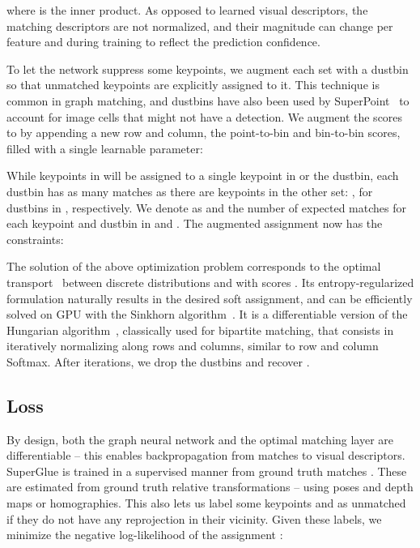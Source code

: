 \documentclass[10pt,twocolumn,letterpaper]{article}
\newcommand{\PAR}[1]{\vskip4pt \noindent{\bf #1~}}
\renewcommand{\*}[1]{\mathbf{#1}}
\newcommand{\0}{\phantom{0}}
\begin{document}
where  is the inner product.
As opposed to learned visual descriptors, the matching descriptors are not normalized, and their magnitude can change per feature and during training to reflect the prediction confidence.

\PAR{Occlusion and Visibility:}
To let the network suppress some keypoints, we augment each set with a dustbin so that unmatched keypoints are explicitly assigned to it. This technique is common in graph matching, and dustbins have also been used by SuperPoint~\cite{superpoint} to account for image cells that might not have a detection. We augment the scores  to  by appending a new row and column, the point-to-bin and bin-to-bin scores, filled with a single learnable parameter:

While keypoints in  will be assigned to a single keypoint in  or the dustbin, each dustbin has as many matches as there are keypoints in the other set: ,  for dustbins in ,  respectively. We denote as  and  the number of expected matches for each keypoint and dustbin in  and . The augmented assignment  now has the constraints:
    

\PAR{Sinkhorn Algorithm:} The solution of the above optimization problem corresponds to the optimal transport~\cite{peyre2019computational} between discrete distributions  and  with scores .
Its entropy-regularized formulation naturally results in the desired soft assignment, and can be efficiently solved on GPU with the Sinkhorn algorithm~\cite{sinkhorn1967concerning, cuturi2013sinkhorn}. It is a differentiable version of the Hungarian algorithm~\cite{munkres1957algorithms}, classically used for bipartite matching, that consists in iteratively normalizing  along rows and columns, similar to row and column Softmax.
After  iterations, we drop the dustbins and recover .

\subsection{Loss}
By design, both the graph neural network and the optimal matching layer are differentiable -- this enables backpropagation from matches to visual descriptors. SuperGlue is trained in a supervised manner from ground truth matches . These are estimated from ground truth relative transformations -- using poses and depth maps or homographies. This also lets us label some keypoints  and  as unmatched if they do not have any reprojection in their vicinity. Given these labels, we minimize the negative log-likelihood of the assignment :
\end{document}
